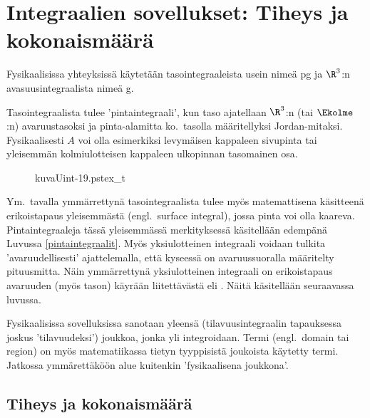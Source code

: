 \section[Integraalien sovellukset: Tiheys ja kokonaismäärä]
{Integraalien sovellukset: Tiheys ja  \\ kokonaismäärä} 
\label{pinta- ja tilavuusintegraalit}
\alku

Fysikaalisissa yhteyksissä käytetään tasointegraaleista usein nimeä 
pg ja $\R^3$:n avasuusintegraalista nimeä 
g. 
\begin{multicols}{2}
Tasointegraalista tulee 'pintaintegraali', kun taso ajatellaan $\R^3$:n (tai $\Ekolme$:n)
avaruustasoksi ja pinta-alamitta ko.\ tasolla määritellyksi Jordan-mitaksi. Fysikaalisesti $A$
voi olla esimerkiksi levymäisen kappaleen sivupinta tai yleisemmän kolmiulotteisen kappaleen
ulkopinnan tasomainen osa.  
\begin{figure}[H]
\begin{center}
{kuvaUint-19.pstex_t}
\end{center}
\end{figure}
\end{multicols}
Ym.\ tavalla  ymmärrettynä tasointegraalista tulee myös matemattisena käsitteenä erikoistapaus 
yleisemmästä  (engl.\ surface integral), jossa pinta voi olla kaareva.
Pintaintegraaleja tässä yleisemmässä merkityksessä käsitellään edempänä Luvussa 
\ref{pintaintegraalit}. Myös yksiulotteinen integraali voidaan tulkita 'avaruudellisesti'
ajattelemalla, että kyseessä on avaruussuoralla määritelty pituusmitta. Näin ymmärrettynä 
yksiulotteinen integraali on erikoistapaus avaruuden (myös tason) käyrään liitettävästä 
 eli . Näitä käsitellään seuraavassa luvussa.

Fysikaalisissa sovelluksissa sanotaan yleensä  (tilavuusintegraalin tapauksessa
joskus 'tilavuudeksi') joukkoa, jonka yli integroidaan. Termi  (engl.\ domain tai 
region) on myös matematiikassa tietyn tyyppisistä joukoista käytetty termi. Jatkossa 
ymmärettäköön alue kuitenkin 'fysikaalisena joukkona'.
 
\subsection{Tiheys ja kokonaismäärä}
 

